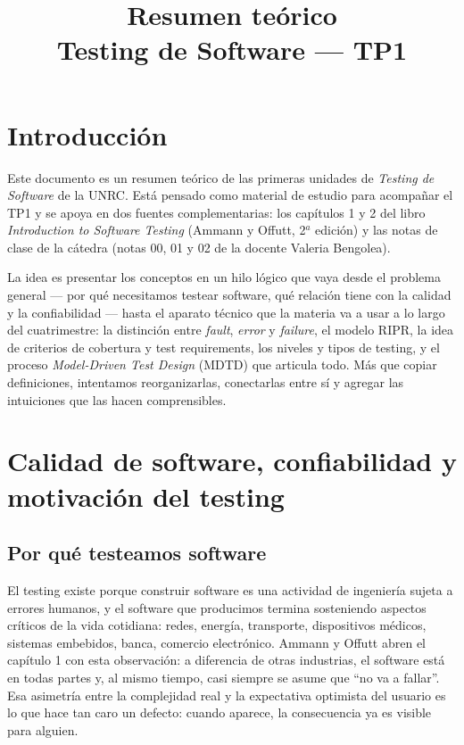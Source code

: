 \documentclass[12pt,a4paper]{article}
\title{\textbf{Resumen teórico}\\Testing de Software --- TP1}
\author{}
\date{}
\begin{document}
\maketitle
\tableofcontents
\newpage

\section*{Introducción}
Este documento es un resumen teórico de las primeras unidades de \textit{Testing de Software} de la UNRC. Está pensado como material de estudio para acompañar el TP1 y se apoya en dos fuentes complementarias: los capítulos 1 y 2 del libro \textit{Introduction to Software Testing} (Ammann y Offutt, 2$^{a}$ edición) y las notas de clase de la cátedra (notas 00, 01 y 02 de la docente Valeria Bengolea).

La idea es presentar los conceptos en un hilo lógico que vaya desde el problema general --- por qué necesitamos testear software, qué relación tiene con la calidad y la confiabilidad --- hasta el aparato técnico que la materia va a usar a lo largo del cuatrimestre: la distinción entre \textit{fault}, \textit{error} y \textit{failure}, el modelo RIPR, la idea de criterios de cobertura y test requirements, los niveles y tipos de testing, y el proceso \textit{Model-Driven Test Design} (MDTD) que articula todo. Más que copiar definiciones, intentamos reorganizarlas, conectarlas entre sí y agregar las intuiciones que las hacen comprensibles.

\section{Calidad de software, confiabilidad y motivación del testing}
\subsection{Por qué testeamos software}
El testing existe porque construir software es una actividad de ingeniería sujeta a errores humanos, y el software que producimos termina sosteniendo aspectos críticos de la vida cotidiana: redes, energía, transporte, dispositivos médicos, sistemas embebidos, banca, comercio electrónico. Ammann y Offutt abren el capítulo 1 con esta observación: a diferencia de otras industrias, el software está en todas partes y, al mismo tiempo, casi siempre se asume que ``no va a fallar''. Esa asimetría entre la complejidad real y la expectativa optimista del usuario es lo que hace tan caro un defecto: cuando aparece, la consecuencia ya es visible para alguien.
\end{document}
